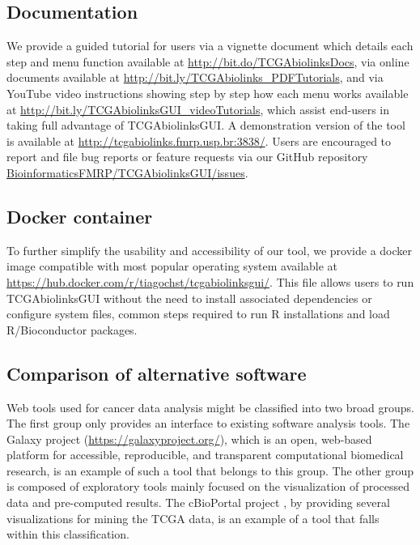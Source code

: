 \subsection{Documentation}

We provide a guided tutorial for users via a vignette document which details each step and menu function available at \href{http://bit.do/TCGAbiolinksDocs}{http://bit.do/TCGAbiolinksDocs}, via online documents available at
\href{http://bit.ly/TCGAbiolinks\_PDFTutorials}{http://bit.ly/TCGAbiolinks\_PDFTutorials}, and via YouTube video instructions showing step by step how each menu works available at \href{http://bit.ly/TCGAbiolinksGUI\_videoTutorials}{http://bit.ly/TCGAbiolinksGUI\_videoTutorials}, which assist end-users in taking full advantage of TCGAbiolinksGUI. A demonstration version of the tool is available at \href{http://tcgabiolinks.fmrp.usp.br:3838/}{http://tcgabiolinks.fmrp.usp.br:3838/}. Users are encouraged to report and file bug reports or feature requests via our GitHub repository \href{https://github.com/BioinformaticsFMRP/TCGAbiolinksGUI/issues}{BioinformaticsFMRP/TCGAbiolinksGUI/issues}.

\subsection{Docker container}
To further simplify the usability and accessibility of our tool, we provide a docker image compatible with most popular operating system available at \\
\href{https://hub.docker.com/r/tiagochst/tcgabiolinksgui/}{https://hub.docker.com/r/tiagochst/tcgabiolinksgui/}. This file allows users to run TCGAbiolinksGUI without the need to install associated dependencies or configure system files, common steps required to run R installations and load R/Bioconductor packages.

\subsection{Comparison of alternative software}

Web tools used for cancer data analysis might be classified into two broad groups.
The first group only provides an interface to existing software analysis tools.
The Galaxy project (\href{https://galaxyproject.org/}{https://galaxyproject.org/}), which is an open, web-based platform for accessible, reproducible, and transparent computational biomedical research, is an example of such a tool that belongs to this group.
The other group is composed of exploratory tools mainly focused on the visualization of processed data and pre-computed results. The cBioPortal project \cite{gao2013integrative,cerami2012cbio}, by providing several visualizations for mining the TCGA data, is an example of a tool that falls within this classification.

